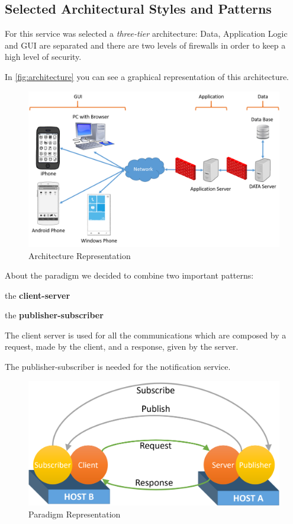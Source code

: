 \documentclass[a4paper]{article}
\begin{document}
\subsection{Selected Architectural Styles and Patterns}

For this service was selected a \emph{three-tier} architecture: Data, Application Logic and GUI are separated and there are two levels of firewalls in order to keep a high level of security.

In \autoref{fig:architecture} you can see a graphical representation of this architecture.

\nopagebreak

\begin{figure}[H]
\includegraphics[width=.9\textwidth]{Architecture}
\centering
\caption{Architecture Representation}
\label{fig:architecture}
\end{figure}

About the paradigm we decided to combine two important patterns: 
\begin{itemize*}
\item the \textbf{client-server}
\item the \textbf{publisher-subscriber}
\end{itemize*}

The client server is used for all the communications which are composed by a request, made by the client, and a response, given by the server.

The publisher-subscriber is needed for the notification service.

\begin{figure}[H]
\includegraphics[width=.65\textwidth]{Paradigm}
\centering
\caption{Paradigm Representation}
\label{fig:paradigm}
\end{figure}
\end{document}
